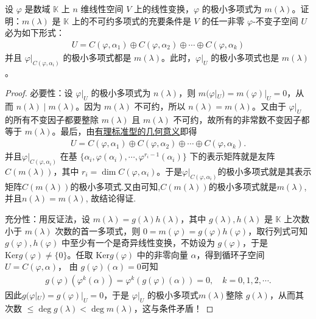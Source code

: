 \documentclass[../../main.tex]{subfiles}%
\begin{document}
\begin{proposition}\label{proposition:极小多项式是不可约多项式的刻画}
设 $\varphi$ 是数域 $\mathbb{K}$ 上 $n$ 维线性空间 $V$ 上的线性变换，$\varphi$ 的极小多项式为 $m(\lambda)$。证明：$m(\lambda)$ 是 $\mathbb{K}$ 上的不可约多项式的充要条件是 $V$ 的任一非零 $\varphi$-不变子空间 $U$ 必为如下形式：
\begin{align*}
U = C(\varphi,\alpha_1)\oplus C(\varphi,\alpha_2)\oplus\cdots\oplus C(\varphi,\alpha_k)
\end{align*}
并且 $\varphi|_{C(\varphi,\alpha_i)}$ 的极小多项式都是 $m(\lambda)$。此时，$\varphi|_U$ 的极小多项式也是 $m(\lambda)$。
\end{proposition}
\begin{proof}

{\heiti 必要性：}设 $\varphi|_U$ 的极小多项式为 $n(\lambda)$，则 $m(\varphi|_U)=m(\varphi)|_U = 0$，从而 $n(\lambda)\mid m(\lambda)$。因为 $m(\lambda)$ 不可约，所以 $n(\lambda)=m(\lambda)$。又由于 $\varphi|_U$ 的所有不变因子都要整除 $m(\lambda)$ 且 $m(\lambda)$ 不可约，故所有的非常数不变因子都等于 $m(\lambda)$。最后，由\hyperref[theorem:有理标准型的几何意义]{有理标准型的几何意义}即得
\begin{align*}
U = C(\varphi,\alpha_1)\oplus C(\varphi,\alpha_2)\oplus\cdots\oplus C(\varphi,\alpha_k).
\end{align*}
并且\(\varphi|_{C(\varphi,\alpha_i)}\) 在基 \(\{\alpha_i,\varphi(\alpha_i),\cdots,\varphi^{r_i - 1}(\alpha_i)\}\) 下的表示矩阵就是友阵 \(C(m(\lambda))\)，其中 \(r_i = \dim C(\varphi,\alpha_i)\)。于是\(\varphi|_{C(\varphi,\alpha_i)}\)的极小多项式就是其表示矩阵\(C(m(\lambda))\)的极小多项式.又由可知,\(C(m(\lambda))\)的极小多项式就是$m(\lambda)$,并且$n(\lambda)=m(\lambda)$,
故结论得证.

{\heiti 充分性：}用反证法，设 $m(\lambda)=g(\lambda)h(\lambda)$，其中 $g(\lambda),h(\lambda)$ 是 $\mathbb{K}$ 上次数小于 $m(\lambda)$ 次数的首一多项式，则 $0=m(\varphi)=g(\varphi)h(\varphi)$，取行列式可知 $g(\varphi),h(\varphi)$ 中至少有一个是奇异线性变换，不妨设为 $g(\varphi)$，于是 $\mathrm{Ker}g(\varphi)\neq \{0\}$。任取 $\mathrm{Ker}g(\varphi)$ 中的非零向量 $\alpha$，得到循环子空间 $U = C(\varphi,\alpha)$，
由 $g(\varphi)(\alpha)=0$可知
\begin{align*}
g(\varphi )(\varphi ^k\left( \alpha \right) )=\varphi ^k\left( g\left( \varphi \right) \left( \alpha \right) \right) =0,\quad k=0,1,2,\cdots .
\end{align*}
因此$g(\varphi|_U)=g(\varphi)|_U = 0$，于是 $\varphi|_U$ 的极小多项式$m(\lambda)$整除 $g(\lambda)$，从而其次数 $\leqslant \deg g(\lambda)<\deg m(\lambda)$，这与条件矛盾！

\end{proof}
\end{document}
